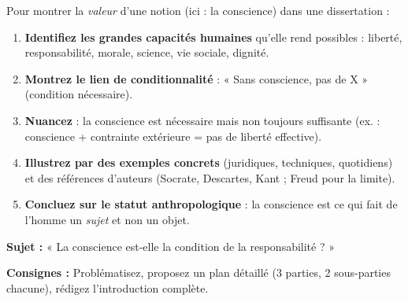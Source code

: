 \documentclass[11pt]{article}
\begin{document}
\begin{methode}
Pour montrer la \emph{valeur} d'une notion (ici : la conscience) dans une dissertation :
\begin{enumerate}
\item \textbf{Identifiez les grandes capacités humaines} qu'elle rend possibles : liberté, responsabilité, morale, science, vie sociale, dignité.
\item \textbf{Montrez le lien de conditionnalité} : « Sans conscience, pas de X » (condition nécessaire).
\item \textbf{Nuancez} : la conscience est nécessaire mais non toujours suffisante (ex. : conscience + contrainte extérieure = pas de liberté effective).
\item \textbf{Illustrez par des exemples concrets} (juridiques, techniques, quotidiens) et des références d'auteurs (Socrate, Descartes, Kant ; Freud pour la limite).
\item \textbf{Concluez sur le statut anthropologique} : la conscience est ce qui fait de l'homme un \emph{sujet} et non un objet.
\end{enumerate}
\end{methode}

\begin{exercice}
\textbf{Sujet :} « La conscience est-elle la condition de la responsabilité ? »

\textbf{Consignes :} Problématisez, proposez un plan détaillé (3 parties, 2 sous-parties chacune), rédigez l'introduction complète.
\end{exercice}
\end{document}
